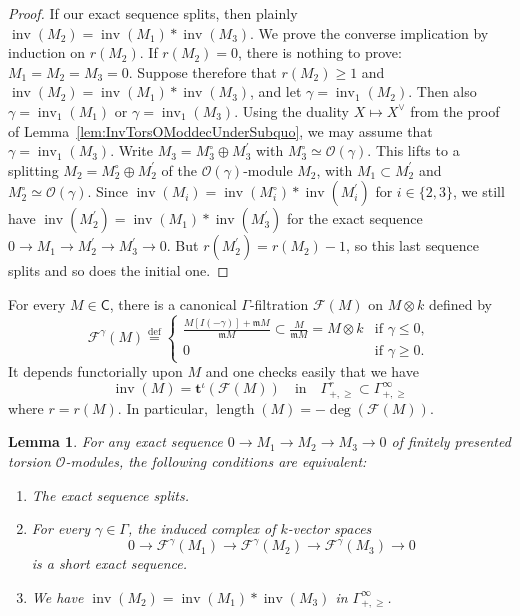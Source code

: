 \documentclass[11pt]{article}
\newtheorem{lemm}[theo]{Lemma}
\theoremstyle{definition}
\numberwithin{equation}{section}
\numberwithin{figure}{section}
\numberwithin{table}{section}
\DeclareMathOperator{\inv}{inv}
\DeclareMathOperator{\length}{length}
\newcommand{\eqd}{\stackrel{\mathrm{def}}{=}}
\newcommand{\sfC}{\mathsf{C}}
\begin{document}
\begin{proof}
If our exact sequence splits, then plainly $\inv(M_{2})=\inv(M_{1})\ast\inv(M_{3})$. We prove the converse implication by induction on $r(M_{2})$. If $r(M_{2})=0$, there is nothing to prove: $M_{1}=M_{2}=M_{3}=0$. Suppose therefore that $r(M_{2})\geq1$ and $\inv(M_{2})=\inv(M_{1})\ast\inv(M_{3})$, and let $\gamma=\inv_{1}(M_{2})$. Then also $\gamma=\inv_{1}(M_{1})$ or $\gamma=\inv_{1}(M_{3})$. Using the duality $X\mapsto X^{\vee}$ from the proof of Lemma~\ref{lem:InvTorsOModdecUnderSubquo}, we may assume that $\gamma=\inv_{1}(M_{3})$. Write $M_{3}=M_{3}^{\circ}\oplus M_{3}^{\prime}$ with $M_{3}^{\circ}\simeq\mathcal{O}(\gamma)$. This lifts to a splitting $M_{2}=M_{2}^{\circ}\oplus M_{2}^{\prime}$ of the $\mathcal{O}(\gamma)$-module $M_{2}$, with $M_{1}\subset M_{2}^{\prime}$ and $M_{2}^{\circ}\simeq\mathcal{O}(\gamma)$. Since $\inv(M_{i})=\inv(M_{i}^{\circ})\ast\inv(M_{i}^{\prime})$ for $i\in\{2,3\}$, we still have $\inv(M_{2}^{\prime})=\inv(M_{1})\ast\inv(M_{3}^{\prime})$ for the exact sequence $0\rightarrow M_{1}\rightarrow M_{2}^{\prime}\rightarrow M_{3}^{\prime}\rightarrow0$. But $r(M_{2}^{\prime})=r(M_{2})-1$, so this last sequence splits and so does the initial one.
\end{proof}

For every $M\in\sfC$, there is a canonical $\Gamma$-filtration $\mathcal{F}(M)$ on $M\otimes k$ defined by
\[
\mathcal{F}^{\gamma}(M)\eqd
\begin{cases}
\frac{M[I(-\gamma)]+\mathfrak{m}M}{\mathfrak{m}M}\subset\frac{M}{\mathfrak{m}M}=M\otimes k & \text{if }\gamma\leq0,\\
0 & \text{if }\gamma\geq0.
\end{cases}
\]
It depends functorially upon $M$ and one checks easily that we have
\[
\inv(M)=\mathbf{t}^{\iota}(\mathcal{F}(M))\quad\text{in}\quad\Gamma_{+,\geq}^{r}\subset\Gamma_{+,\geq}^{\infty}
\]
where $r=r(M)$. In particular, $\length(M)=-\deg(\mathcal{F}(M))$.

\begin{lemm}\label{lem:InvTorsOModExSeqCaseEqual}
For any exact sequence $0\rightarrow M_{1}\rightarrow M_{2}\rightarrow M_{3}\rightarrow0$ of finitely presented torsion $\mathcal{O}$-modules, the following conditions are equivalent:
\begin{enumerate}
\item \label{1.8.1} The exact sequence splits.
\item \label{1.8.2} For every $\gamma\in\Gamma$, the induced complex of $k$-vector spaces
\[
0\rightarrow\mathcal{F}^{\gamma}(M_{1})\rightarrow\mathcal{F}^{\gamma}(M_{2})\rightarrow\mathcal{F}^{\gamma}(M_{3})\rightarrow0
\]
is a short exact sequence.
\item \label{1.8.3} We have $\inv(M_{2})=\inv(M_{1})\ast\inv(M_{3})$ in $\Gamma_{+,\geq}^{\infty}$.
\end{enumerate}
\end{lemm}
\end{document}
